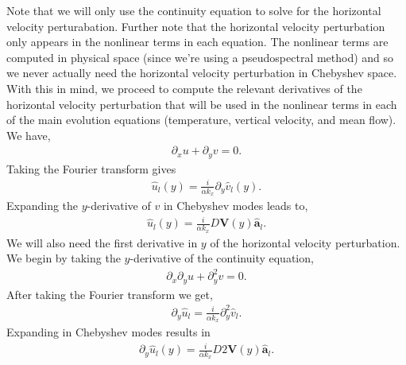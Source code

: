\documentclass[12pt]{article}
\newcommand{\lr}[1]{\left(#1\right)}
\newcommand{\wh}[1]{\widehat{#1}}
\begin{document}
    Note that we will only use the continuity equation to solve for the horizontal velocity 
    perturabation.  Further note that the horizontal velocity perturbation only appears in 
    the nonlinear terms in each equation.  The nonlinear terms are computed in physical space 
    (since we're using a pseudospectral method) and so we never actually need the horizontal 
    velocity perturbation in Chebyshev space.  With this in mind, we proceed to compute the 
    relevant derivatives of the horizontal velocity perturbation that will be used in the 
    nonlinear terms in each of the main evolution equations (temperature, vertical velocity, 
    and mean flow).  We have, 
    \begin{align}
      \partial_{x}u + \partial_{y}v = 0.
    \end{align}
    Taking the Fourier transform gives 
    \begin{align}
      \wh{u}_{l}\lr{y} = \frac{i}{\alpha k_{x}} \partial_{y}\wh{v}_{l}\lr{y}.
    \end{align}
    Expanding the $y$-derivative of $v$ in Chebyshev modes leads to,
    \begin{align}
      \wh{u}_{l}\lr{y} = \frac{i}{\alpha k_{x}} D\mathbf{V}\lr{y}\wh{\mathbf{a}}_{l}.
      \label{eq:uly}
    \end{align}
    We will also need the first derivative in $y$ of the horizontal velocity perturbation.  
    We begin by taking the $y$-derivative of the continuity equation, 
    \begin{align}
      \partial_{x}\partial_{y}u + \partial_{y}^{2}v = 0.
    \end{align}
    After taking the Fourier transform we get, 
    \begin{align}
      \partial_{y}\wh{u}_{l} = \frac{i}{\alpha k_{x}}\partial_{y}^{2}\wh{v}_{l}.
    \end{align}
    Expanding in Chebyshev modes results in 
    \begin{align}
      \partial_{y}\wh{u}_{l}\lr{y} = \frac{i}{\alpha k_{x}}D2\mathbf{V}\lr{y}\wh{\mathbf{a}}_{l}.
      \label{eq:dyuly}
    \end{align}

\end{document}
